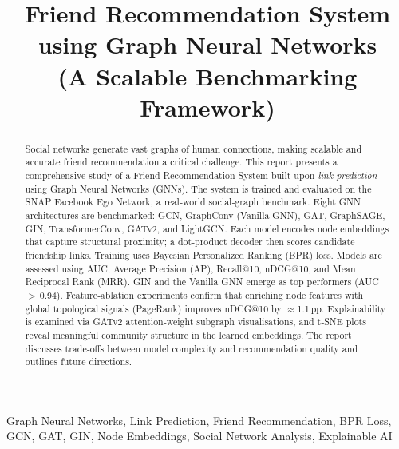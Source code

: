 \documentclass[conference]{IEEEtran}
\begin{document}
\title{Friend Recommendation System\\using Graph Neural Networks\\(A Scalable Benchmarking Framework)}
\author{
}
\maketitle
\begin{abstract}
Social networks generate vast graphs of human connections, making scalable and accurate friend recommendation a critical challenge. This report presents a comprehensive study of a Friend Recommendation System built upon \emph{link prediction} using Graph Neural Networks (GNNs). The system is trained and evaluated on the SNAP Facebook Ego Network, a real‑world social‑graph benchmark. Eight GNN architectures are benchmarked: GCN, GraphConv (Vanilla GNN), GAT, GraphSAGE, GIN, TransformerConv, GATv2, and LightGCN. Each model encodes node embeddings that capture structural proximity; a dot‑product decoder then scores candidate friendship links. Training uses Bayesian Personalized Ranking (BPR) loss. Models are assessed using AUC, Average Precision (AP), Recall@10, nDCG@10, and Mean Reciprocal Rank (MRR). GIN and the Vanilla GNN emerge as top performers (AUC $>$ 0.94). Feature‑ablation experiments confirm that enriching node features with global topological signals (PageRank) improves nDCG@10 by $\approx$1.1 pp. Explainability is examined via GATv2 attention‑weight subgraph visualisations, and t‑SNE plots reveal meaningful community structure in the learned embeddings. The report discusses trade‑offs between model complexity and recommendation quality and outlines future directions.
\end{abstract}
\begin{IEEEkeywords}
Graph Neural Networks, Link Prediction, Friend Recommendation, BPR Loss, GCN, GAT, GIN, Node Embeddings, Social Network Analysis, Explainable AI
\end{IEEEkeywords}
\end{document}
